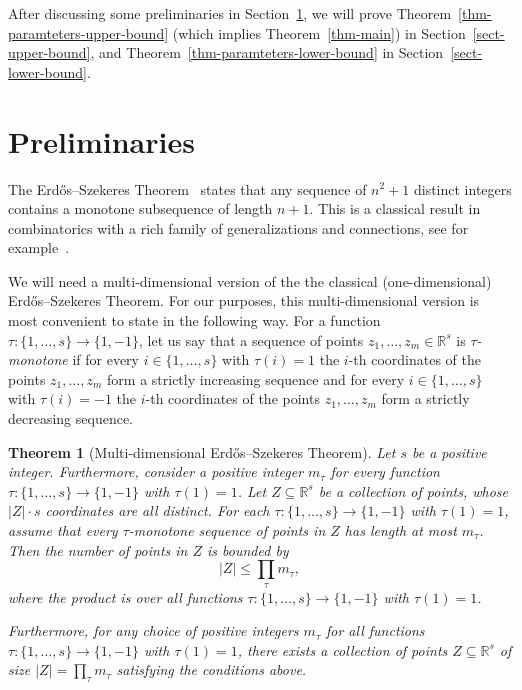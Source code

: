 \documentclass{aic}
\newtheorem{theorem}{Theorem}[section]
\theoremstyle{definition}
\numberwithin{equation}{section}
\numberwithin{figure}{section}
\newcommand{\su}{\subseteq}
\begin{document}
After discussing some preliminaries in Section~\ref{sect-preliminaries}, we will prove Theorem~\ref{thm-paramteters-upper-bound} (which implies Theorem~\ref{thm-main}) in Section~\ref{sect-upper-bound}, and Theorem~\ref{thm-paramteters-lower-bound} in Section~\ref{sect-lower-bound}.

\section{Preliminaries}
\label{sect-preliminaries}

The Erd\H{o}s--Szekeres Theorem~\cite{ES} states that any sequence of $n^2+1$ distinct integers contains a monotone subsequence of length $n+1$. This is a classical result in combinatorics with a rich family of generalizations and connections, see for example~\cite{ExpES,GL,LS,MS,ST}.

We will need a multi-dimensional version of the the classical (one-dimensional) Erd\H{o}s--Szekeres Theorem. For our purposes, this multi-dimensional version is most convenient to state in the following way. For a function $\tau:\{1,\dots,s\}\to \{1,-1\}$, let us say that a sequence of points $z_1,\dots,z_m\in \mathbb{R}^s$ is \emph{$\tau$-monotone} if for every $i\in \{1,\dots,s\}$ with $\tau(i)=1$ the $i$-th coordinates of the points $z_1,\dots,z_m$ form a strictly increasing sequence and for every $i\in \{1,\dots,s\}$ with $\tau(i)=-1$ the $i$-th coordinates of the points $z_1,\dots,z_m$ form a strictly decreasing sequence. 

\begin{theorem}[Multi-dimensional Erd\H{o}s--Szekeres Theorem]\label{thm_es}
Let $s$ be a positive integer. Furthermore, consider a positive integer $m_\tau$ for every function $\tau:\{1,\dots,s\}\to \{1,-1\}$ with $\tau(1)=1$. Let $Z\su \mathbb{R}^s$ be a collection of points, whose $|Z|\cdot s$ coordinates are all distinct. For each $\tau:\{1,\dots,s\}\to \{1,-1\}$ with $\tau(1)=1$, assume that every $\tau$-monotone sequence of points in $Z$ has length at most $m_\tau$. Then the number of points in $Z$ is bounded by
\[|Z|\le \prod_{\tau} m_{\tau},\]
where the product is over all functions $\tau:\{1,\dots,s\}\to \{1,-1\}$ with $\tau(1)=1$.

Furthermore, for any choice of positive integers $m_\tau$ for all functions $\tau:\{1,\dots,s\}\to \{1,-1\}$ with $\tau(1)=1$, there exists a collection of points $Z\su \mathbb{R}^s$ of size $|Z|=\prod_\tau m_\tau$ satisfying the conditions above.
\end{theorem}
\end{document}
